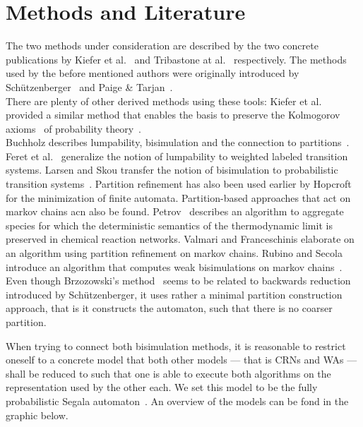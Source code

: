 \documentclass[11pt, rgb]{scrartcl}
\begin{document}
\section{Methods and Literature}
The two methods under consideration are described by the two concrete publications by Kiefer et al.~\autocite{Kiefer2013OnTC} and Tribastone at al.~\autocite{Cardelli2017MaximalAO} respectively. 
The methods used by the before mentioned authors were originally introduced by Schützenberger~\autocite{schutz} and Paige \& Tarjan~\autocite{paigetarjan}. \\
There are plenty of other derived methods using these tools: 
Kiefer et al. provided a similar method that enables the basis to preserve the Kolmogorov axioms~\autocite{kolo} of probability theory~\autocite{kieferstab}. \\
Buchholz describes lumpability, bisimulation and the connection to partitions~\autocite{buchholz2008bisimulation, buchholz}. 
Feret et al.~\autocite{feret2012lumpability} generalize the notion of lumpability to weighted labeled transition systems. 
Larsen and Skou transfer the notion of bisimulation to probabilistic transition systems~\autocite{larsen1991bisimulation}.
Partition refinement has also been used earlier by Hopcroft ~\autocite{hopcroft1971n} for the minimization of finite automata. Partition-based approaches that act on markov chains acn also be found. Petrov~\autocite{petrov2019markov} describes an algorithm to aggregate species for which the deterministic semantics of the thermodynamic limit is preserved in chemical reaction networks. Valmari and Franceschinis elaborate on an algorithm using partition refinement on markov chains. Rubino and Secola introduce an algorithm that computes weak bisimulations on markov chains~\autocite{rubino1989weak}.
Even though Brzozowski's method~\autocite{brzozowski} seems to be related to backwards reduction introduced by Schützenberger, it uses rather a minimal partition construction approach, that is it constructs the automaton, such that there is no coarser partition.

When trying to connect both bisimulation methods, it is reasonable to restrict oneself to a concrete model that both other models --- that is CRNs and WAs --- shall be reduced to such that one is able to execute both algorithms on the representation used by the other each. We set this model to be the fully probabilistic Segala automaton~\autocite{segala1995probabilistic}. An overview of the models can be fond in the graphic below. \\
\end{document}
